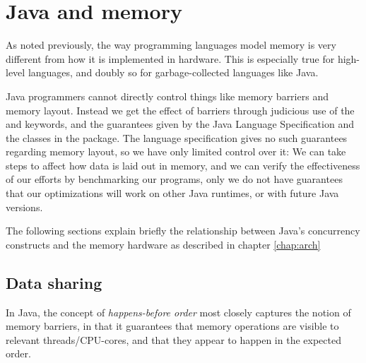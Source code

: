 \chapter{Java and memory}
\label{chap:javamem}

As noted previously, the way programming languages model memory is very
different from how it is implemented in hardware. This is especially true for
high-level languages, and doubly so for garbage-collected languages like Java.

Java programmers cannot directly control things like memory barriers and memory
layout. Instead we get the effect of barriers through judicious use of the
 and  keywords, and the guarantees given by
the Java Language Specification\cite{javaspec} and the classes in the
 package.
The language specification gives no such guarantees regarding memory
layout, so we have only limited control over it: We can take steps to affect how
data is laid out in memory, and we can verify the effectiveness of our efforts
by benchmarking our programs, only we do not have guarantees that our
optimizations will work on other Java runtimes, or with future Java versions.

The following sections explain briefly the relationship between Java's
concurrency constructs and the memory hardware as described in chapter
\ref{chap:arch}

\section{Data sharing}
In Java, the concept of \textit{happens-before order} most closely captures the
notion of memory barriers, in that it guarantees that memory operations are
visible to relevant threads/CPU-cores, and that they appear to happen in the
expected order.

